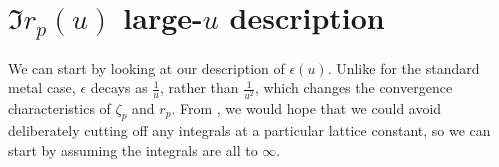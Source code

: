 \documentclass[11pt]{article}
\begin{document}
	\section{$\Im r_p(u)$ large-$u$ description} \label{sec:imrpasymptotic}

	We can start by looking at our description of $\epsilon(u)$.
	Unlike for the standard metal case, $\epsilon$ decays as $\frac{1}{u}$, rather than $\frac{1}{u^2}$, which changes the convergence characteristics of $\zeta_p$ and $r_p$.
	From \cite{Churchill2016}, we would hope that we could avoid deliberately cutting off any integrals at a particular lattice constant, so we can start by assuming the integrals are all to $\infty$.


	\newpage
	\listoftodos
	\newpage
	\printbibliography
\end{document}

